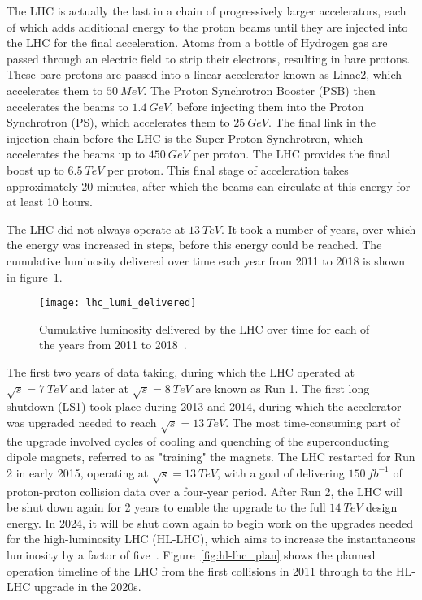 The LHC is actually the last in a chain of progressively larger accelerators,
each of which adds additional energy to the proton beams until they are injected into the LHC for the final acceleration.
Atoms from a bottle of Hydrogen gas are passed through an electric field to strip their electrons,
resulting in bare protons.
These bare protons are passed into a linear accelerator known as Linac2, which accelerates them to $50~MeV$.
The Proton Synchrotron Booster (PSB) then accelerates the beams to $1.4~GeV$,
before injecting them into the Proton Synchrotron (PS), which accelerates them to $25~GeV$.
The final link in the injection chain before the LHC is the Super Proton Synchrotron,
which accelerates the beams up to $450~GeV$ per proton.
The LHC provides the final boost up to $6.5~TeV$ per proton.
This final stage of acceleration takes approximately 20 minutes, after which the beams can circulate at this energy for
at least 10 hours.

The LHC did not always operate at $13~TeV$.
It took a number of years, over which the energy was increased in steps, before this energy could be reached.
The cumulative luminosity delivered over time each year from 2011 to 2018 is shown in figure~\ref{fig:lhc_lumi_delivered}.

\begin{figure}[!ht]\centering
\texttt{[image: lhc\_lumi\_delivered]}
\caption{Cumulative luminosity delivered by the LHC over time for each of the years from 2011 to 2018~\cite{lhc-luminosity-public}.}
\label{fig:lhc_lumi_delivered}
\end{figure}

The first two years of data taking, during which the LHC operated at $\sqrt{s}=7~TeV$ and later at $\sqrt{s}=8~TeV$ are known as Run 1.
The first long shutdown (LS1) took place during 2013 and 2014, during which the accelerator was upgraded needed to reach $\sqrt{s}=13~TeV$.
The most time-consuming part of the upgrade involved cycles of cooling and quenching of the superconducting dipole magnets, referred to as "training" the magnets.
The LHC restarted for Run 2 in early 2015, operating at $\sqrt{s}=13~TeV$, with a goal of delivering $150~fb^{-1}$ of proton-proton collision data over a four-year period.
After Run 2, the LHC will be shut down again for 2 years to enable the upgrade to the full $14~TeV$ design energy.
In 2024, it will be shut down again to begin work on the upgrades needed for the high-luminosity LHC (HL-LHC), which aims to increase the instantaneous luminosity by a factor of five~\cite{atlas-hl-lhc}.
Figure~\ref{fig:hl-lhc_plan} shows the planned operation timeline of the LHC from the first collisions in 2011 through to the HL-LHC upgrade in the 2020s.


